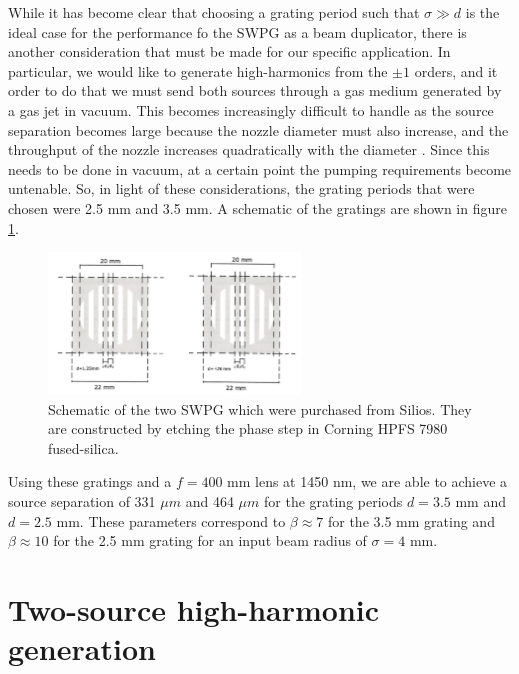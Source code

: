 While it has become clear that choosing a grating period such that $\sigma\gg d$ is the ideal case for the performance fo the SWPG as a beam duplicator, there is another consideration that must be made for our specific application.  In particular, we would like to generate high-harmonics from the $\pm1$ orders, and it order to do that we must send both sources through a gas medium generated by a gas jet in vacuum.  This becomes increasingly difficult to handle as the source separation becomes large because the nozzle diameter must also increase, and the throughput of the nozzle increases quadratically with the diameter \cite{scolesAtomicMolecularBeam1988}.  Since this needs to be done in vacuum, at a certain point the pumping requirements become untenable.  So, in light of these considerations, the grating periods that were chosen were 2.5 mm and 3.5 mm.  A schematic of the gratings are shown in figure \ref{fig:silios_sketch}.
\begin{figure}
	\centering
	\includegraphics[width=0.6\textwidth]{figures/Two_source/silios_sketch.png}
	\caption{Schematic of the two SWPG which were purchased from Silios.  They are constructed by etching the phase step in Corning HPFS 7980 fused-silica.}
	\label{fig:silios_sketch}
\end{figure}
Using these gratings and a $f=400$ mm lens at 1450 nm, we are able to achieve a source separation of 331 $\mu m$ and 464 $\mu m$ for the grating periods $d=3.5$ mm and $d=2.5$ mm.  These parameters correspond to $\beta\approx7$ for the 3.5 mm grating and $\beta\approx10$ for the 2.5 mm grating for an input beam radius of $\sigma=4$ mm.

\section{Two-source high-harmonic generation}

